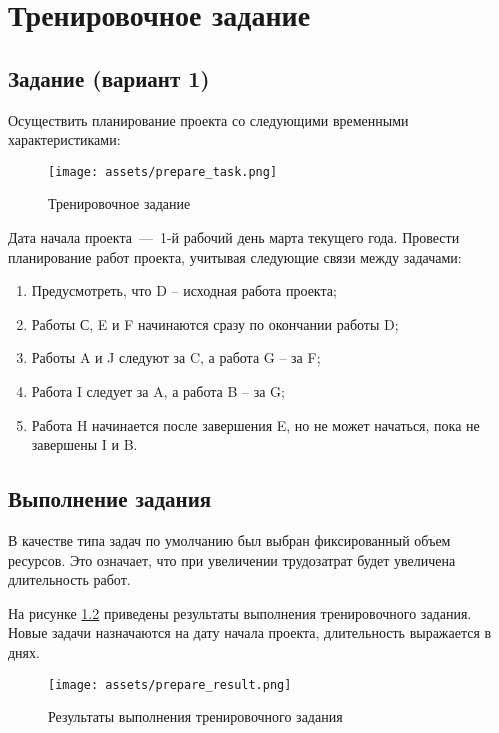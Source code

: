 \chapter{Тренировочное задание}

\section{Задание (вариант 1)}

Осуществить планирование проекта со следующими временными характеристиками:

\begin{figure}[H]
    \begin{center}
    \texttt{[image: assets/prepare\_task.png]}
    \caption{Тренировочное задание}
    \label{fig:1}
    \end{center}
\end{figure}

Дата начала проекта~---~1-й рабочий день марта текущего года. Провести планирование работ проекта, учитывая следующие связи между задачами:

\begin{enumerate}
	\item Предусмотреть, что D – исходная работа проекта;
	\item Работы С, E и F начинаются сразу по окончании работы D;
	\item Работы A и J следуют за C, а работа G – за F;
	\item Работа I следует за A, а работа B – за G;
	\item Работа H начинается после завершения E, но не может начаться, пока не завершены I и B.
\end{enumerate}

\newpage

\section{Выполнение задания}

В качестве типа задач по умолчанию был выбран фиксированный объем ресурсов. 
Это означает, что при увеличении трудозатрат будет увеличена длительность работ.

На рисунке \ref{fig:prepare_result} приведены результаты выполнения тренировочного задания. Новые задачи назначаются на дату начала проекта, длительность выражается в днях.

\begin{figure}[H]
    \begin{center}
    \texttt{[image: assets/prepare\_result.png]}
    \caption{Результаты выполнения тренировочного задания}
    \label{fig:prepare_result}
    \end{center}
\end{figure}

